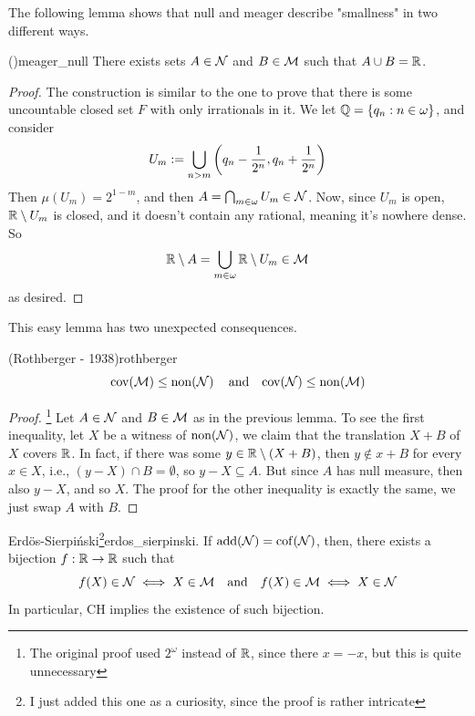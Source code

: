 The following lemma shows that null and meager describe "smallness" in two different ways.

\begin{lemma}{(\cite{bartoszynsky})}{meager_null}
    There exists sets $A\in\mathcal{N}$ and $B\in\mathcal{M}$ such that $A\cup B=\mathbb{R}$.
\end{lemma}

\begin{proof}
    The construction is similar to the one to prove that there is some uncountable closed set $F$ with only irrationals in it. We let $\mathbb{Q}=\{q_n:n\in\omega\}$, and consider
    $$U_m:=\bigcup_{n>m}{\left(q_n-\frac1{2^n},q_n+\frac1{2^n}\right)}$$
    Then $\mu(U_m)=2^{1-m}$, and then $A=\bigcap_{m\in\omega}U_m\in\mathcal{N}$. Now, since $U_m$ is open, $\mathbb{R}\setminus U_m$ is closed, and it doesn't contain any rational, meaning it's nowhere dense. So
    $$\mathbb{R}\setminus A=\bigcup_{m\in\omega}\mathbb{R}\setminus U_m\in\mathcal{M}$$
    as desired.
\end{proof}

This easy lemma has two unexpected consequences.

\begin{theorem}{(Rothberger - 1938)}{rothberger}
$$\mathrm{cov}\!\left(\mathcal{M}\right)\leq\mathrm{non}\!\left(\mathcal{N}\right)\quad\text{and}\quad\mathrm{cov}\!\left(\mathcal{N}\right)\leq\mathrm{non}\!\left(\mathcal{M}\right)$$  
\end{theorem}

\begin{proof}\footnote{The original proof used $2^\omega$ instead of $\mathbb{R}$, since there $x=-x$, but this is quite unnecessary}
    Let $A\in\mathcal{N}$ and $B\in\mathcal{M}$ as in the previous lemma. To see the first inequality, let $X$ be a witness of $\mathrm{non}\!\left(\mathcal{N}\right)$, we claim that the translation $X+B$ of $X$ covers $\mathbb{R}$. In fact, if there was some $y\in\mathbb{R}\setminus(X+B)$, then $y\notin x+B$ for every $x\in X$, i.e., $(y-X)\cap B=\emptyset$, so $y-X\subseteq A$. But since $A$ has null measure, then also $y-X$, and so $X$. The proof for the other inequality is exactly the same, we just swap $A$ with $B$.
\end{proof}

\begin{theorem}{Erdös-Sierpiński\footnote{I just added this one as a curiosity, since the proof is rather intricate}}{erdos_sierpinski}. If $\mathrm{add}\!\left(\mathcal{N}\right)=\mathrm{cof}\!\left(\mathcal{N}\right)$, then, there exists a bijection $f:\mathbb{R}\to\mathbb{R}$ such that
$$f(X)\in\mathcal{N}\iff X\in\mathcal{M}\quad\text{and}\quad f(X)\in\mathcal{M}\iff X\in\mathcal{N}$$
    In particular, $\text{CH}$ implies the existence of such bijection.
\end{theorem}